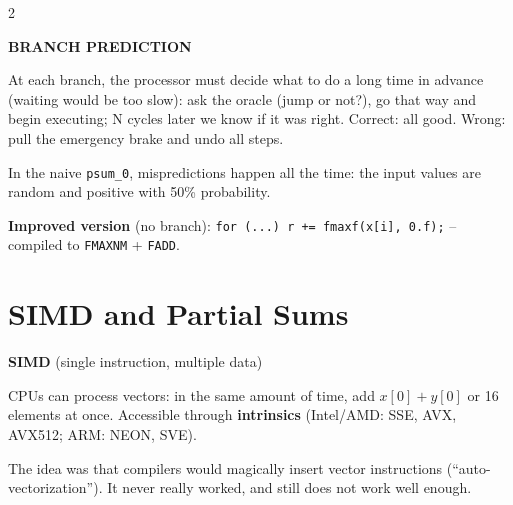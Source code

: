 \documentclass[a4paper,9pt]{extarticle}
\begin{document}
\begin{multicols}{2}
\begin{itemize}
\end{itemize}


\begin{definition}

\textbf{BRANCH PREDICTION}

At each branch, the processor must decide what to do a long time in advance (waiting would be
too slow): ask the oracle (jump or not?), go that way and begin executing; N cycles later we
know if it was right. Correct: all good. Wrong: pull the emergency brake and undo all steps.

\end{definition}


\begin{warning}

In the naive \texttt{psum\_0}, mispredictions happen all the time: the input values are random
and positive with 50\% probability.

\end{warning}


\begin{example}

\textbf{Improved version} (no branch):
\texttt{for (...) r += fmaxf(x[i], 0.f);} -- compiled to \texttt{FMAXNM} + \texttt{FADD}.

\end{example}



\section{SIMD and Partial Sums}


\begin{definition}

\textbf{SIMD} (single instruction, multiple data)

CPUs can process vectors: in the same amount of time, add $x[0]+y[0]$ or 16 elements at once.
Accessible through \textbf{intrinsics} (Intel/AMD: SSE, AVX, AVX512; ARM: NEON, SVE).

\end{definition}


\begin{warning}

The idea was that compilers would magically insert vector instructions (``auto-vectorization'').
It never really worked, and still does not work well enough.

\end{warning}



\end{multicols}
\end{document}
